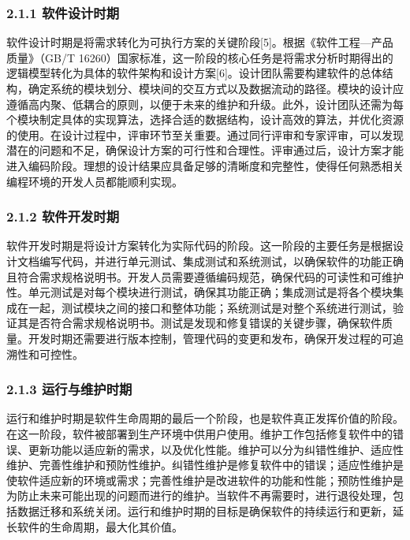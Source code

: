 \subsubsection{2.1.1 软件设计时期}\label{ux8f6fux4ef6ux8bbeux8ba1ux65f6ux671f}

软件设计时期是将需求转化为可执行方案的关键阶段{[}5{]}。根据《软件工程---产品质量》（GB/T 16260）国家标准，这一阶段的核心任务是将需求分析时期得出的逻辑模型转化为具体的软件架构和设计方案{[}6{]}。设计团队需要构建软件的总体结构，确定系统的模块划分、模块间的交互方式以及数据流动的路径。模块的设计应遵循高内聚、低耦合的原则，以便于未来的维护和升级。此外，设计团队还需为每个模块制定具体的实现算法，选择合适的数据结构，设计高效的算法，并优化资源的使用。在设计过程中，评审环节至关重要。通过同行评审和专家评审，可以发现潜在的问题和不足，确保设计方案的可行性和合理性。评审通过后，设计方案才能进入编码阶段。理想的设计结果应具备足够的清晰度和完整性，使得任何熟悉相关编程环境的开发人员都能顺利实现。

\subsubsection{2.1.2 软件开发时期}\label{ux8f6fux4ef6ux5f00ux53d1ux65f6ux671f}

软件开发时期是将设计方案转化为实际代码的阶段。这一阶段的主要任务是根据设计文档编写代码，并进行单元测试、集成测试和系统测试，以确保软件的功能正确且符合需求规格说明书。开发人员需要遵循编码规范，确保代码的可读性和可维护性。单元测试是对每个模块进行测试，确保其功能正确；集成测试是将各个模块集成在一起，测试模块之间的接口和整体功能；系统测试是对整个系统进行测试，验证其是否符合需求规格说明书。测试是发现和修复错误的关键步骤，确保软件质量。开发时期还需要进行版本控制，管理代码的变更和发布，确保开发过程的可追溯性和可控性。

\subsubsection{2.1.3 运行与维护时期}\label{ux8fd0ux884cux4e0eux7ef4ux62a4ux65f6ux671f}

运行和维护时期是软件生命周期的最后一个阶段，也是软件真正发挥价值的阶段。在这一阶段，软件被部署到生产环境中供用户使用。维护工作包括修复软件中的错误、更新功能以适应新的需求，以及优化性能。维护可以分为纠错性维护、适应性维护、完善性维护和预防性维护。纠错性维护是修复软件中的错误；适应性维护是使软件适应新的环境或需求；完善性维护是改进软件的功能和性能；预防性维护是为防止未来可能出现的问题而进行的维护。当软件不再需要时，进行退役处理，包括数据迁移和系统关闭。运行和维护时期的目标是确保软件的持续运行和更新，延长软件的生命周期，最大化其价值。

